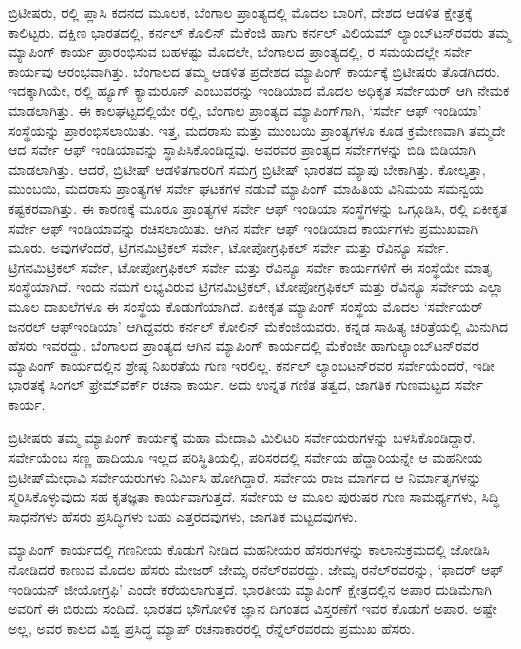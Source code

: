 ಬ್ರಿಟೀಷರು,  ರಲ್ಲಿ ಪ್ಲಾಸಿ ಕದನದ ಮೂಲಕ, ಬೆಂಗಾಲ ಪ್ರಾಂತ್ಯದಲ್ಲಿ ಮೊದಲ ಬಾರಿಗೆ, ದೇಶದ ಆಡಳಿತ ಕ್ಷೇತ್ರಕ್ಕೆ ಕಾಲಿಟ್ಟರು. ದಕ್ಷಿಣ ಭಾರತದಲ್ಲಿ, ಕರ್ನಲ್​ ಕೊಲಿನ್​ ಮೆಕೆಂಜಿ ಹಾಗು ಕರ್ನಲ್​ ವಿಲಿಯಮ್ ಲ್ಯಾಂಬ್​ಟನ್​ರವರು ತಮ್ಮ ಮ್ಯಾಪಿಂಗ್​ ಕಾರ್ಯ ಪ್ರಾರಂಭಿಸುವ ಬಹಳಷ್ಟು ಮೊದಲೇ, ಬೆಂಗಾಲದ ಪ್ರಾಂತ್ಯದಲ್ಲಿ, ರ ಸಮಯದಲ್ಲೇ ಸರ್ವೇ ಕಾರ್ಯವು ಆರಂಭವಾಗಿತ್ತು. ಬೆಂಗಾಲದ ತಮ್ಮ ಆಡಳಿತ ಪ್ರದೇಶದ ಮ್ಯಾಪಿಂಗ್​ ಕಾರ್ಯಕ್ಕೆ ಬ್ರಿಟೀಷರು ತೊಡಗಿದರು. ಇದಕ್ಕಾಗಿಯೇ, ರಲ್ಲಿ ಹ್ಯೂಗ್​ ಕ್ಯಾಮರೂನ್​ ಎಂಬುವರನ್ನು ಇಂಡಿಯಾದ ಮೊದಲ ಅಧಿಕೃತ ಸರ್ವೇಯರ್​ ಆಗಿ ನೇಮಕ ಮಾಡಲಾಗಿತ್ತು. ಈ ಕಾಲಘಟ್ಟದಲ್ಲಿಯೇ ರಲ್ಲಿ, ಬೆಂಗಾಲ ಪ್ರಾಂತ್ಯದ ಮ್ಯಾಪಿಂಗ್​ಗಾಗಿ, ‘ಸರ್ವೇ ಆಫ್​ ಇಂಡಿಯಾ’ ಸಂಸ್ಥೆಯನ್ನು ಪ್ರಾರಂಭಿಸಲಾಯಿತು. ಇತ್ತ, ಮದರಾಸು ಮತ್ತು ಮುಂಬಯಿ ಪ್ರಾಂತ್ಯಗಳೂ ಕೂಡ ಕ್ರಮೇಣವಾಗಿ ತಮ್ಮದೇ ಆದ ಸರ್ವೇ ಆಫ್​ ಇಂಡಿಯಾವನ್ನು ಸ್ಥಾಪಿಸಿಕೊಂಡಿದ್ದವು. ಅವರವರ ಪ್ರಾಂತ್ಯದ ಸರ್ವೇಗಳನ್ನು ಬಿಡಿ ಬಿಡಿಯಾಗಿ ಮಾಡಲಾಗಿತ್ತು. ಆದರೆ, ಬ್ರಿಟೀಷ್​ ಆಡಳಿತಗಾರರಿಗೆ ಸಮಗ್ರ ಬ್ರಿಟೀಷ್​ ಭಾರತದ ಮ್ಯಾಪು ಬೇಕಾಗಿತ್ತು. ಕೋಲ್ಕತ್ತಾ, ಮುಂಬಯಿ, ಮದರಾಸು ಪ್ರಾಂತ್ಯಗಳ ಸರ್ವೇ ಘಟಕಗಳ ನಡುವೆೆ ಮ್ಯಾಪಿಂಗ್​ ಮಾಹಿತಿಯ ವಿನಿಮಯ ಸಮನ್ವಯ ಕಷ್ಟಕರವಾಗಿತ್ತು. ಈ ಕಾರಣಕ್ಕೆ ಮೂರೂ ಪ್ರಾಂತ್ಯಗಳ ಸರ್ವೇ ಆಫ್​ ಇಂಡಿಯಾ ಸಂಸ್ಥೆಗಳನ್ನು ಒಗ್ಗೂಡಿಸಿ, ರಲ್ಲಿ ಏಕೀಕೃತ ಸರ್ವೇ ಆಫ್​ ಇಂಡಿಯಾವನ್ನು ರಚಿಸಲಾಯಿತು. ಆಗಿನ ಸರ್ವೇ ಆಫ್​ ಇಂಡಿಯಾದ ಕಾರ್ಯಗಳು ಪ್ರಮುಖವಾಗಿ ಮೂರು. ಅವುಗಳೆಂದರೆ, ಟ್ರಿಗನಮಿಟ್ರಿಕಲ್​ ಸರ್ವೇ, ಟೋಪೋಗ್ರಫಿಕಲ್​ ಸರ್ವೇ ಮತ್ತು ರೆವಿನ್ಯೂ ಸರ್ವೇ. ಟ್ರಿಗನಮಿಟ್ರಿಕಲ್​ ಸರ್ವೇ, ಟೋಪೋಗ್ರಫಿಕಲ್​ ಸರ್ವೇ ಮತ್ತು ರೆವಿನ್ಯೂ ಸರ್ವೇ ಕಾರ್ಯಗಳಿಗೆ ಈ ಸಂಸ್ಥೆಯೇ ಮಾತೃ ಸಂಸ್ಥೆಯಾಗಿದೆ. ಇಂದು ನಮಗೆ ಲಭ್ಯವಿರುವ ಟ್ರಿಗನಮಿಟ್ರಿಕಲ್​, ಟೋಪೋಗ್ರಫಿಕಲ್​ ಮತ್ತು ರೆವಿನ್ಯೂ ಸರ್ವೇಯ ಎಲ್ಲಾ ಮೂಲ ದಾಖಲೆಗಳೂ ಈ ಸಂಸ್ಥೆಯ ಕೊಡುಗೆಯಾಗಿದೆ. ಏಕೀಕೃತ ಮ್ಯಾಪಿಂಗ್​ ಸಂಸ್ಥೆಯ ಮೊದಲ ‘ಸರ್ವೇಯರ್​ ಜನರಲ್​ ಆಫ್​ ಇಂಡಿಯಾ’ ಆಗಿದ್ದವರು ಕರ್ನಲ್​ ಕೋಲಿನ್​ ಮೆಕೆಂಜಿಯವರು. ಕನ್ನಡ ಸಾಹಿತ್ಯ ಚರಿತ್ರೆಯಲ್ಲಿ ಮಿನುಗಿದ ಹೆಸರು ಇವರದ್ದು. ಬೆಂಗಾಲದ ಪ್ರಾಂತ್ಯದ ಆಗಿನ ಮ್ಯಾಪಿಂಗ್​ ಕಾರ್ಯದಲ್ಲಿ ಮೆಕೆಂಜೀ ಹಾಗು\break ಲ್ಯಾಂಬ್​ಟನ್​ರವರ ಮ್ಯಾಪಿಂಗ್​ ಕಾರ್ಯದಲ್ಲಿನ ಶ್ರೇಷ್ಠ ನಿಖರತೆಯ ಗುಣ ಇರಲಿಲ್ಲ. ಕರ್ನಲ್​ ಲ್ಯಾಂಬಟನ್​ರವರ ಸರ್ವೇಯೆಂದರೆ, ಇಡೀ ಭಾರತಕ್ಕೆ ಸಿಂಗಲ್​ ಫ್ರೇಮ್‌ವರ್ಕ್ ರಚನಾ ಕಾರ್ಯ. ಅದು ಉನ್ನತ ಗಣಿತ ತತ್ವದ, ಜಾಗತಿಕ ಗುಣಮಟ್ಟದ ಸರ್ವೇ ಕಾರ್ಯ.

\vskip 4pt

ಬ್ರಿಟೀಷರು ತಮ್ಮ ಮ್ಯಾಪಿಂಗ್​ ಕಾರ್ಯಕ್ಕೆ ಮಹಾ ಮೇದಾವಿ ಮಿಲಿಟರಿ ಸರ್ವೇಯರುಗಳನ್ನು ಬಳಸಿಕೊಂಡಿದ್ದಾರೆ. ಸರ್ವೇಯೆಂಬ ಸಣ್ಣ ಹಾದಿಯೂ ಇಲ್ಲದ ಪರಿಸ್ಥಿತಿಯಲ್ಲಿ, ಪರಿಸರದಲ್ಲಿ ಸರ್ವೇಯ ಹೆದ್ದಾರಿಯನ್ನೇ ಆ ಮಹನೀಯ ಬ್ರಿಟೀಷ್​ ಮೇಧಾವಿ ಸರ್ವೇಯರುಗಳು ನಿರ್ಮಿಸಿ ಹೋಗಿದ್ದಾರೆ. ಸರ್ವೇಯ ರಾಜ ಮಾರ್ಗದ ಆ ನಿರ್ಮಾತೃಗಳನ್ನು ಸ್ಮರಿಸಿಕೊಳ್ಳುವುದು ಸಹ ಕೃತಜ್ಞತಾ ಕಾರ್ಯವಾಗುತ್ತದೆ. ಸರ್ವೇಯ ಆ ಮೂಲ ಪುರುಷರ ಗುಣ ಸಾಮರ್ಥ್ಯಗಳು, ಸಿದ್ಧಿ ಸಾಧನೆಗಳು ಹೆಸರು ಪ್ರಸಿದ್ಧಿಗಳು ಬಹು ಎತ್ತರದವುಗಳು, ಜಾಗತಿಕ ಮಟ್ಟದವುಗಳು.

\vskip 4pt

ಮ್ಯಾಪಿಂಗ್​ ಕಾರ್ಯದಲ್ಲಿ ಗಣನೀಯ ಕೊಡುಗೆ ನೀಡಿದ ಮಹನೀಯರ ಹೆಸರುಗಳನ್ನು ಕಾಲಾನುಕ್ರಮದಲ್ಲಿ ಜೋಡಿಸಿ ನೋಡಿದರೆ ಕಾಣುವ ಮೊದಲ ಹೆಸರು ಮೇಜರ್​ ಜೇಮ್ಸ ರನೆಲ್​ರವರದ್ದು. ಜೇಮ್ಸ ರನೆಲ್​ರವರನ್ನು, ‘ಫಾದರ್​ ಆಫ್​ ಇಂಡಿಯನ್​ ಜೀಯೋಗ್ರಫಿ’ ಎಂದೇ ಕರೆಯಲಾಗುತ್ತದೆ. ಭಾರತೀಯ ಮ್ಯಾಪಿಂಗ್​ ಕ್ಷೇತ್ರದಲ್ಲಿನ ಅಪಾರ ದುಡಿಮೆಗಾಗಿ ಅವರಿಗೆ ಈ ಬಿರುದು ಸಂದಿದೆ. ಭಾರತದ ಭೌಗೋಳಿಕ ಜ್ಞಾನ ದಿಗಂತದ ವಿಸ್ತರಣೆಗೆ ಇವರ ಕೊಡುಗೆ ಅಪಾರ. ಅಷ್ಟೇ ಅಲ್ಲ, ಅವರ ಕಾಲದ ವಿಶ್ವ ಪ್ರಸಿದ್ಧ ಮ್ಯಾಪ್​ ರಚನಾಕಾರರಲ್ಲಿ ರೆನ್ನೆಲ್​ರವರದು ಪ್ರಮುಖ ಹೆಸರು.

